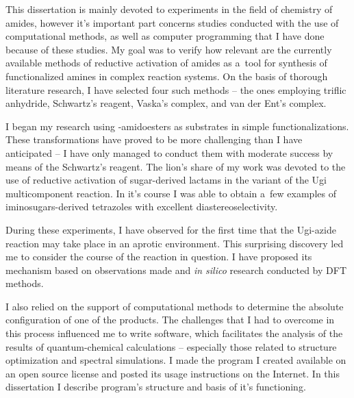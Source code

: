 This dissertation is mainly devoted to experiments in the field of chemistry of amides,
  however it's important part concerns studies conducted with the use of computational methods,
  as well as computer programming that I have done because of these studies.
My goal was to verify how relevant are the currently available methods of reductive activation
  of amides as a~tool for synthesis of functionalized amines in complex reaction systems.
On the basis of thorough literature research, I have selected four such methods \---
  the ones employing triflic anhydride, Schwartz's reagent, Vaska's complex,
  and van der Ent's complex.

I began my research using \textbeta{}-amidoesters as substrates in simple functionalizations.
These transformations have proved to be more challenging than I have anticipated \---
  I have only managed to conduct them with moderate success by means of the Schwartz's reagent.
The lion's share of my work was devoted to the use of reductive activation of sugar-derived
  lactams in the variant of the Ugi multicomponent reaction.
In it's course I was able to obtain a~few examples of iminosugars-derived tetrazoles with
  excellent diastereoselectivity.

During these experiments, I have observed for the first time that the Ugi-azide reaction
  may take place in an aprotic environment.
This surprising discovery led me to consider the course of the reaction in question.
I have proposed its mechanism based on observations made and \textit{in silico} research
  conducted by DFT methods.

I also relied on the support of computational methods to determine the absolute
  configuration of one of the products.
The challenges that I had to overcome in this process influenced me to write \tesliper{} software,
  which facilitates the analysis of the results of quantum-chemical calculations \--- especially
  those related to structure optimization and spectral simulations.
I made the program I created available on an open source license and posted its usage instructions 
  on the Internet.
In this dissertation I describe program's structure and basis of it's functioning.

